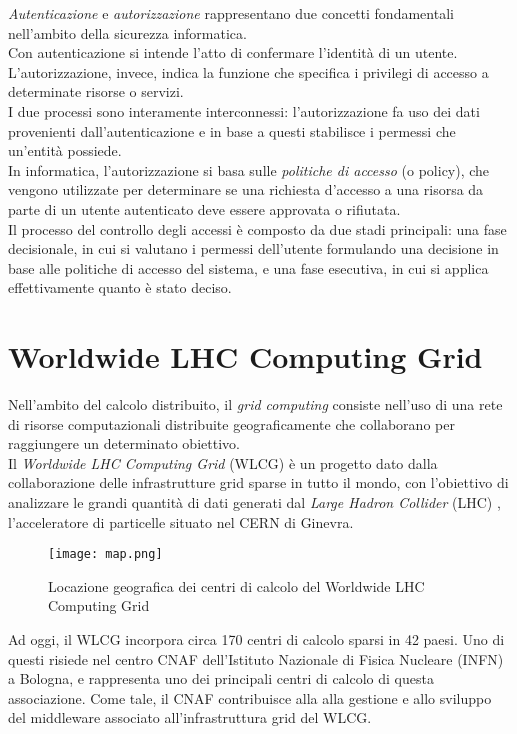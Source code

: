 \textit{Autenticazione} e \textit{autorizzazione} rappresentano due concetti fondamentali nell'ambito della
 sicurezza informatica.
 \\ Con autenticazione si intende l'atto di confermare l'identità di un utente. 
 L'autorizzazione, invece, indica la funzione che specifica i privilegi di accesso a determinate risorse o servizi.
\\I due processi sono interamente interconnessi: l'autorizzazione fa uso dei dati provenienti 
dall'autenticazione e in base a questi stabilisce i 
permessi che un'entità possiede.
\\ In informatica, l'autorizzazione si basa sulle \textit{politiche di accesso} (o policy), che vengono utilizzate per determinare se 
una richiesta d'accesso a una risorsa da parte di un utente autenticato deve essere approvata o rifiutata.
\\ Il processo del controllo degli accessi è composto da due stadi principali: una fase decisionale, in cui si valutano i permessi dell'utente 
 formulando una decisione in base alle politiche di accesso del sistema,
e una fase esecutiva, in cui si applica effettivamente quanto è stato deciso. 

\section{Worldwide LHC Computing Grid}
Nell'ambito del calcolo distribuito, il \textit{grid computing} consiste 
nell'uso di una rete di risorse computazionali distribuite geograficamente che collaborano 
per raggiungere un determinato obiettivo.
\\ Il \textit{Worldwide LHC Computing Grid} (WLCG) \cite{wlcg_doc} è un progetto dato dalla
 collaborazione 
delle infrastrutture grid sparse in tutto il mondo, con l'obiettivo
di analizzare le grandi quantità di dati generati dal \textit{Large Hadron Collider} (LHC) \cite{cern_lhc}, 
l'acceleratore di particelle situato nel CERN di Ginevra. 
\begin{figure}[h]
    \texttt{[image: map.png]}
    \centering
    \caption{Locazione geografica dei centri di calcolo del Worldwide LHC Computing Grid}
    \label{mappa}
\end{figure}

Ad oggi, il WLCG incorpora circa 170 centri di calcolo sparsi in 42 paesi. 
Uno di questi risiede nel centro CNAF dell'Istituto Nazionale di Fisica Nucleare (INFN) \cite{infn_cnaf} a Bologna,
 e rappresenta uno dei principali centri di calcolo di questa associazione. Come tale, il CNAF contribuisce alla
  alla gestione e allo sviluppo del middleware associato all'infrastruttura grid del WLCG. 


